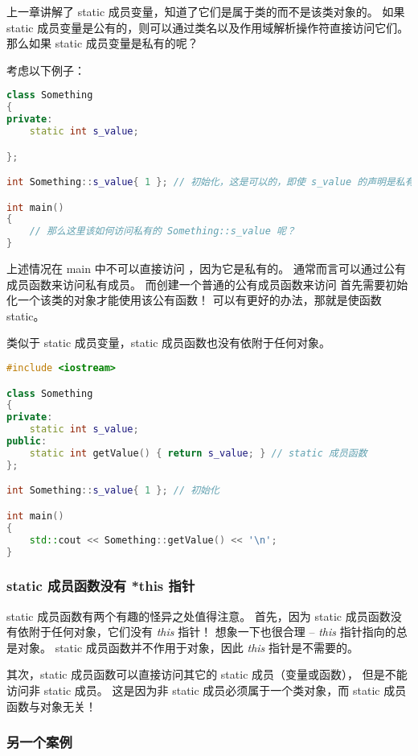 \documentclass[../../LearnCpp.tex]{subfiles}
\begin{document}

上一章讲解了 static 成员变量，知道了它们是属于类的而不是该类对象的。
如果 static 成员变量是公有的，则可以通过类名以及作用域解析操作符直接访问它们。
那么如果 static 成员变量是私有的呢？

考虑以下例子：

\begin{lstlisting}[language=C++]
class Something
{
private:
    static int s_value;

};

int Something::s_value{ 1 }; // 初始化，这是可以的，即使 s_value 的声明是私有的

int main()
{
    // 那么这里该如何访问私有的 Something::s_value 呢？
}
\end{lstlisting}

上述情况在 main 中不可以直接访问 ，因为它是私有的。
通常而言可以通过公有成员函数来访问私有成员。
而创建一个普通的公有成员函数来访问  首先需要初始化一个该类的对象才能使用该公有函数！
可以有更好的办法，那就是使函数 static。

类似于 static 成员变量，static 成员函数也没有依附于任何对象。

\begin{lstlisting}[language=C++]
#include <iostream>

class Something
{
private:
    static int s_value;
public:
    static int getValue() { return s_value; } // static 成员函数
};

int Something::s_value{ 1 }; // 初始化

int main()
{
    std::cout << Something::getValue() << '\n';
}
\end{lstlisting}

\subsubsection*{static 成员函数没有 *this 指针}

static 成员函数有两个有趣的怪异之处值得注意。
首先，因为 static 成员函数没有依附于任何对象，它们没有 \textit{this} 指针！
想象一下也很合理 -- \textit{this} 指针指向的总是对象。
static 成员函数并不作用于对象，因此 \textit{this} 指针是不需要的。

其次，static 成员函数可以直接访问其它的 static 成员（变量或函数），
但是不能访问非 static 成员。
这是因为非 static 成员必须属于一个类对象，而 static 成员函数与对象无关！

\subsubsection*{另一个案例}
\end{document}
